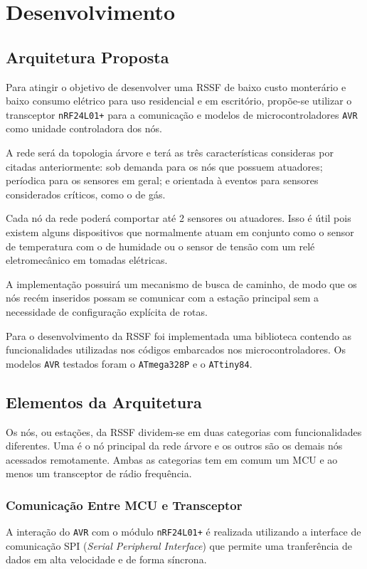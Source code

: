 \chapter{Desenvolvimento}
\label{cap:6}

\section{Arquitetura Proposta}
Para atingir o objetivo de desenvolver uma RSSF de baixo custo monterário e baixo consumo elétrico para uso
residencial e em escritório, propõe-se utilizar o transceptor \texttt{nRF24L01+} para a comunicação e modelos de
microcontroladores \texttt{AVR} como unidade controladora dos nós.

A rede será da topologia árvore e terá as três características consideras por
 citadas anteriormente: sob demanda para os nós que possuem atuadores;
períodica para os sensores em geral; e orientada à eventos para sensores considerados críticos, como o de gás.

Cada nó da rede poderá comportar até 2 sensores ou atuadores. Isso é útil pois existem alguns dispositivos que
normalmente atuam em conjunto como o sensor de temperatura com o de humidade ou o sensor de tensão com um relé
eletromecânico em tomadas elétricas.

A implementação possuirá um mecanismo de busca de caminho, de modo que os nós recém inseridos possam se
comunicar com a estação principal sem a necessidade de configuração explícita de rotas.

Para o desenvolvimento da RSSF foi implementada uma biblioteca contendo as funcionalidades utilizadas nos
códigos embarcados nos microcontroladores. Os modelos \texttt{AVR} testados foram o \texttt{ATmega328P} e o
\texttt{ATtiny84}.

\section{Elementos da Arquitetura}
Os nós, ou estações, da RSSF dividem-se em duas categorias com funcionalidades diferentes. Uma é o nó
principal da rede árvore e os outros são os demais nós acessados remotamente. Ambas as categorias tem em comum
um MCU e ao menos um transceptor de rádio frequência.

\subsection{Comunicação Entre MCU e Transceptor}
A interação do \texttt{AVR} com o módulo \texttt{nRF24L01+} é realizada utilizando a interface de comunicação
SPI (\textit{Serial Peripheral Interface}) que permite uma tranferência de dados em alta velocidade e de forma
síncrona.


